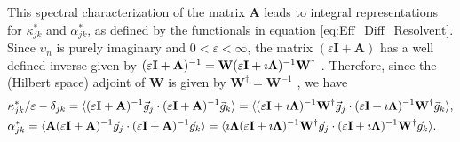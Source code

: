 \documentclass[11pt]{amsart}
\newcommand{\Ib}{\mathbf{I}}
\newcommand{\Ab}{\mathbf{A}}
\newcommand{\Wb}{\mathbf{W}}
\newcommand\bLambda{\mbox{\boldmath${\Lambda}$}}
\begin{document}
This spectral characterization of the matrix $\Ab$ leads to integral
representations for $\kappa_{jk}^*$ and $\alpha_{jk}^*$, as defined by the
functionals in equation \eqref{eq:Eff_Diff_Resolvent}. Since $\upsilon_n$ is
purely imaginary and $0<\varepsilon<\infty$, the matrix $(\varepsilon\Ib+\Ab)$ has a well defined
inverse given by
$(\varepsilon\Ib+\Ab)^{-1}=\Wb(\varepsilon\Ib+\imath\bLambda)^{-1}\Wb^\dagger$
\cite{Horn_Johnson-1990}. Therefore, since the (Hilbert space) adjoint
of $\Wb$ is given by $\Wb^\dagger=\Wb^{-1}$
\cite{Horn_Johnson-1990,Keener-2000}, we have  
% 
\begin{align}\label{eq:Functionals_kappa_alpha}
  &\kappa^*_{jk}/\varepsilon-\delta_{jk}=\langle(\varepsilon\Ib+\Ab)^{-1}\vec{g}_j\cdot(\varepsilon\Ib+\Ab)^{-1}\vec{g}_k\rangle 
=\langle(\varepsilon\Ib+\imath\bLambda)^{-1}\Wb^\dagger\vec{g}_j\cdot(\varepsilon\Ib+\imath\bLambda)^{-1}\Wb^\dagger\vec{g}_k\rangle ,
\\
&\alpha^*_{jk}=\langle\Ab(\varepsilon\Ib+\Ab)^{-1}\vec{g}_j\cdot(\varepsilon\Ib+\Ab)^{-1}\vec{g}_k\rangle
=\langle\imath\bLambda(\varepsilon\Ib+\imath\bLambda)^{-1}\Wb^\dagger\vec{g}_j\cdot(\varepsilon\Ib+\imath\bLambda)^{-1}\Wb^\dagger\vec{g}_k\rangle. 
\notag
\end{align}
%
\end{document}

